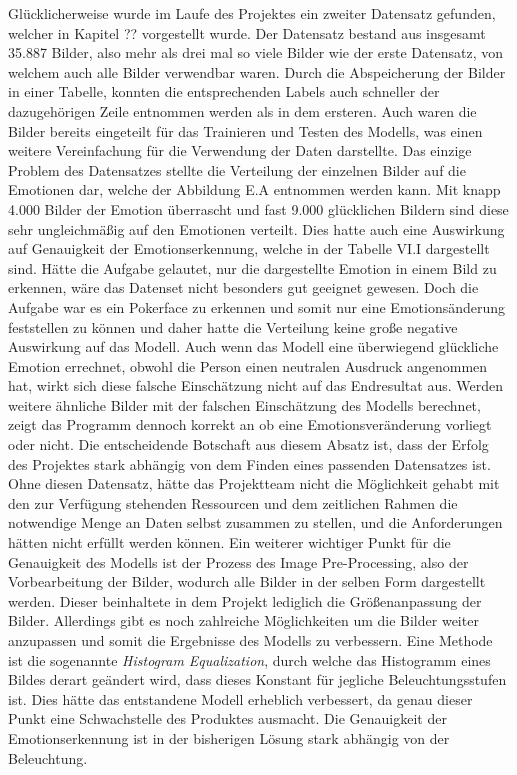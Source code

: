 \documentclass[12pt, a4paper]{report}
\begin{document}
Glücklicherweise wurde im Laufe des Projektes ein zweiter Datensatz gefunden, welcher in Kapitel ?? vorgestellt wurde. Der Datensatz bestand aus insgesamt 35.887 Bilder, also mehr als drei mal so viele Bilder wie der erste Datensatz, von welchem auch alle Bilder verwendbar waren. Durch die Abspeicherung der Bilder in einer Tabelle, konnten die entsprechenden Labels auch schneller der dazugehörigen Zeile entnommen werden als in dem ersteren. Auch waren die Bilder bereits eingeteilt für das Trainieren und Testen des Modells, was einen weitere Vereinfachung für die Verwendung der Daten darstellte. Das einzige Problem des Datensatzes stellte die Verteilung der einzelnen Bilder auf die Emotionen dar, welche der Abbildung E.A entnommen werden kann. Mit knapp 4.000 Bilder der Emotion überrascht und fast 9.000 glücklichen Bildern sind diese sehr ungleichmäßig auf den Emotionen verteilt. Dies hatte auch eine Auswirkung auf  Genauigkeit der Emotionserkennung, welche in der Tabelle VI.I dargestellt sind. Hätte die Aufgabe gelautet, nur die dargestellte Emotion in einem Bild zu erkennen, wäre das Datenset nicht besonders gut geeignet gewesen. Doch die Aufgabe war es ein Pokerface zu erkennen und somit nur eine Emotionsänderung feststellen zu können und daher hatte die Verteilung keine große negative Auswirkung auf das Modell. Auch wenn das Modell eine überwiegend glückliche Emotion errechnet, obwohl die Person einen neutralen Ausdruck angenommen hat, wirkt sich diese falsche Einschätzung nicht auf das Endresultat aus. Werden weitere ähnliche Bilder mit der falschen Einschätzung des Modells berechnet, zeigt das Programm dennoch korrekt an ob eine Emotionsveränderung vorliegt oder nicht. Die entscheidende Botschaft aus diesem Absatz ist, dass der Erfolg des Projektes stark abhängig von dem Finden eines passenden Datensatzes ist. Ohne diesen Datensatz, hätte das Projektteam nicht die Möglichkeit gehabt mit den zur Verfügung stehenden Ressourcen und dem zeitlichen Rahmen die notwendige Menge an Daten selbst zusammen zu stellen, und die Anforderungen hätten nicht erfüllt werden können.
\newline
Ein weiterer wichtiger Punkt für die Genauigkeit des Modells ist der Prozess des Image Pre-Processing, also der Vorbearbeitung der Bilder, wodurch alle Bilder in der selben Form dargestellt werden. Dieser beinhaltete in dem Projekt lediglich die Größenanpassung der Bilder. Allerdings gibt es noch zahlreiche Möglichkeiten um die Bilder weiter anzupassen und somit die Ergebnisse des Modells zu verbessern. Eine Methode ist die sogenannte \textit{Histogram Equalization}, durch welche das Histogramm eines Bildes derart geändert wird, dass dieses Konstant für jegliche Beleuchtungsstufen ist. Dies hätte das entstandene Modell erheblich verbessert, da genau dieser Punkt eine Schwachstelle des Produktes ausmacht. Die Genauigkeit der Emotionserkennung ist in der bisherigen Lösung stark abhängig von der Beleuchtung. 
\end{document}
